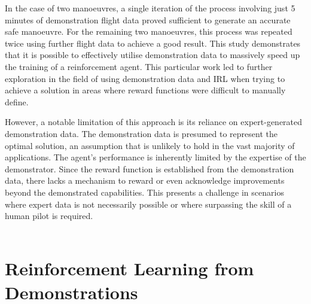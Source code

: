 In the case of two manoeuvres, a single iteration of the process involving just 5 minutes of demonstration flight data proved sufficient to generate an accurate safe manoeuvre.
For the remaining two manoeuvres, this process was repeated twice using further flight data to achieve a good result.
This study demonstrates that it is possible to effectively utilise demonstration data to massively speed up the training of a reinforcement agent.
This particular work led to further exploration in the field of using demonstration data and IRL when trying to achieve a solution in areas where reward functions were difficult to manually define.

However, a notable limitation of this approach is its reliance on expert-generated demonstration data.
The demonstration data is presumed to represent the optimal solution, an assumption that is unlikely to hold in the vast majority of applications.
The agent's performance is inherently limited by the expertise of the demonstrator.
Since the reward function is established from the demonstration data, there lacks a mechanism to reward or even acknowledge improvements beyond the demonstrated capabilities.
This presents a challenge in scenarios where expert data is not necessarily possible or where surpassing the skill of a human pilot is required. \\\\


\section{Reinforcement Learning from Demonstrations}


